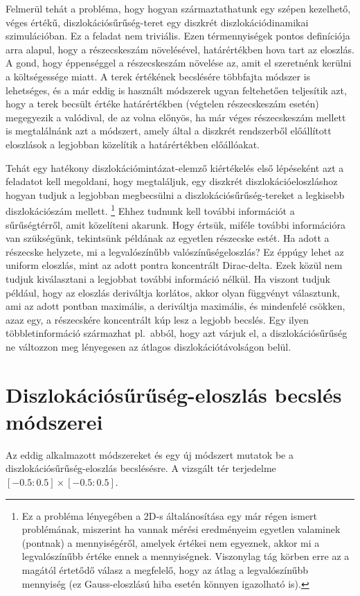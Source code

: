 \documentclass[10pt,a4paper]{scrartcl}
\begin{document}
Felmerül tehát a probléma, hogy hogyan származtathatunk egy szépen kezelhető, véges értékű, diszlokációsűrűség-teret egy diszkrét diszlokációdinamikai szimulációban. Ez a feladat nem triviális. Ezen térmennyiségek pontos definíciója arra alapul, hogy a részecskeszám növelésével, határértékben hova tart az eloszlás. A gond, hogy éppenséggel a részecskeszám növelése az, amit el szeretnénk kerülni a költségessége miatt. A terek értékének becslésére többfajta módszer is lehetséges, és a már eddig is használt módszerek ugyan feltehetően teljesítik azt, hogy a terek becsült értéke határértékben (végtelen részecskeszám esetén) megegyezik a valódival, de az volna előnyös, ha már véges részecskeszám mellett is megtalálnánk azt a módszert, amely által a diszkrét rendszerből előállított eloszlások a legjobban közelítik a határértékben előállóakat.

Tehát egy hatékony diszlokációmintázat-elemző kiértékelés első lépéseként azt a feladatot kell megoldani, hogy megtaláljuk, egy diszkrét diszlokációeloszláshoz hogyan tudjuk a legjobban megbecsülni a diszlokációsűrűség-tereket a legkisebb diszlokációszám mellett.
\footnote{Ez a probléma lényegében a 2D-s általánosítása egy már régen ismert problémának, miszerint ha vannak mérési eredményeim egyetlen valaminek (pontnak) a mennyiségéről, amelyek értékei nem egyeznek, akkor mi a legvalószínűbb értéke ennek a mennyiségnek. Viszonylag tág körben erre az a magától értetődő válasz a megfelelő, hogy az átlag a legvalószínűbb mennyiség (ez Gauss-eloszlású hiba esetén könnyen igazolható is).} Ehhez tudnunk kell további információt a sűrűségtérről, amit közelíteni akarunk. Hogy értsük, miféle további információra van szükségünk, tekintsünk példának az egyetlen részecske estét. Ha adott a részecske helyzete, mi a legvalószínűbb valószínűségeloszlás? Ez éppúgy lehet az uniform eloszlás, mint az adott pontra koncentrált Dirac-delta. Ezek közül nem tudjuk kiválasztani a legjobbat további információ nélkül. Ha viszont tudjuk például, hogy az eloszlás deriváltja korlátos, akkor olyan függvényt választunk, ami az adott pontban maximális, a deriváltja maximális, és mindenfelé csökken, azaz egy, a részecskére koncentrált kúp lesz a legjobb becslés. Egy ilyen többletinformáció származhat pl.\ abból, hogy azt várjuk el, a diszlokációsűrűség ne változzon meg lényegesen az átlagos diszlokációtávolságon belül.

\section{Diszlokációsűrűség-eloszlás becslés módszerei}
Az eddig alkalmazott módszereket és egy új módszert mutatok be a diszlokációsűrűség-eloszlás becslésésre. A vizsgált tér terjedelme $\left[ { - 0.5:0.5} \right] \times \left[ { - 0.5:0.5} \right]$.
\end{document}
